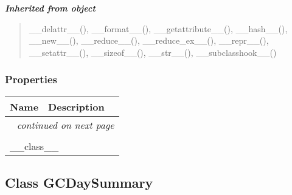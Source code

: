 \large{\textbf{\textit{Inherited from object}}}

\begin{quote}
\_\_delattr\_\_(), \_\_format\_\_(), \_\_getattribute\_\_(), \_\_hash\_\_(), \_\_new\_\_(), \_\_reduce\_\_(), \_\_reduce\_ex\_\_(), \_\_repr\_\_(), \_\_setattr\_\_(), \_\_sizeof\_\_(), \_\_str\_\_(), \_\_subclasshook\_\_()
\end{quote}


  \subsubsection{Properties}

    \vspace{-1cm}
\hspace{\varindent}\begin{longtable}{|p{\varnamewidth}|p{\vardescrwidth}|l}
\cline{1-2}
\cline{1-2} \centering \textbf{Name} & \centering \textbf{Description}& \\
\cline{1-2}
\endhead\cline{1-2}\multicolumn{3}{r}{\small\textit{continued on next page}}\\\endfoot\cline{1-2}
\endlastfoot\multicolumn{2}{|l|}{\textit{Inherited from object}}\\
\multicolumn{2}{|p{\varwidth}|}{\raggedright \_\_class\_\_}\\
\cline{1-2}
\end{longtable}



\subsection{Class GCDaySummary}

